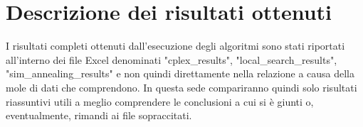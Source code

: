 \documentclass[preprint,12pt]{elsarticle}
\begin{document}
\section{Descrizione dei risultati ottenuti}
\label{S:4}

I risultati completi ottenuti dall'esecuzione degli algoritmi sono stati riportati all'interno dei file Excel denominati "cplex\_results", "local\_search\_results", "sim\_annealing\_results" e non quindi direttamente nella relazione a causa della mole di dati che comprendono. In questa sede compariranno quindi solo risultati riassuntivi utili a meglio comprendere le conclusioni a cui si è giunti o, eventualmente, rimandi ai file sopraccitati. 













\end{document}

